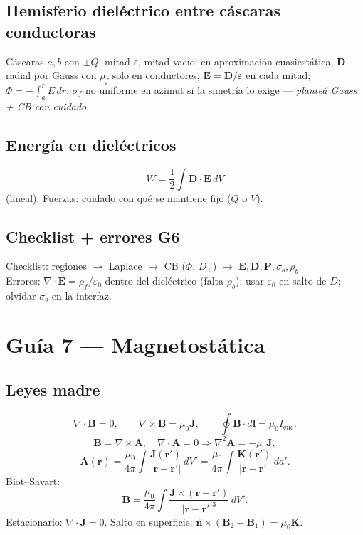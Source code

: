 \documentclass[10pt,a4paper]{article}
\newcommand{\vect}[1]{\mathbf{#1}}
\newcommand{\uv}[1]{\hat{\mathbf{#1}}}
\newcommand{\eps}{\varepsilon}
\newcommand{\epso}{\varepsilon_0}
\newcommand{\muo}{\mu_0}
\begin{document}
\subsection{Hemisferio dieléctrico entre cáscaras conductoras}
Cáscaras $a,b$ con $\pm Q$; mitad $\eps$, mitad vacío: en aproximación cuasiestática, $\vect{D}$ radial por Gauss con $\rho_f$ solo en conductores; $\vect{E}=\vect{D}/\eps$ en cada mitad; $\Phi=-\int_a^r E\,dr$; $\sigma_f$ no uniforme en azimut si la simetría lo exige --- \emph{planteá Gauss + CB con cuidado}.

\subsection{Energía en dieléctricos}
\[
W=\frac12\int\vect{D}\cdot\vect{E}\,dV
\]
(lineal). Fuerzas: cuidado con qué se mantiene fijo ($Q$ o $V$).

\subsection{Checklist + errores G6}
Checklist: regiones $\to$ Laplace $\to$ CB ($\Phi$, $D_\perp$) $\to$ $\vect{E},\vect{D},\vect{P},\sigma_b,\rho_b$.\\
Errores: $\nabla\cdot\vect{E}=\rho_f/\epso$ dentro del dieléctrico (falta $\rho_b$); usar $\epso$ en salto de $D$; olvidar $\sigma_b$ en la interfaz.

\section{Guía 7 --- Magnetostática}

\subsection{Leyes madre}
\[
\nabla\cdot\vect{B}=0,\qquad
\nabla\times\vect{B}=\muo\vect{J},\qquad
\oint\vect{B}\cdot d\vect{l}=\muo I_{\mathrm{enc}}.
\]
\[
\vect{B}=\nabla\times\vect{A},\quad\nabla\cdot\vect{A}=0\Rightarrow\nabla^2\vect{A}=-\muo\vect{J},
\]
\[
\vect{A}(\vect{r})=\frac{\muo}{4\pi}\int\frac{\vect{J}(\vect{r}')}{|\vect{r}-\vect{r}'|}\,dV'
=\frac{\muo}{4\pi}\int\frac{\vect{K}(\vect{r}')}{|\vect{r}-\vect{r}'|}\,da'.
\]
Biot--Savart:
\[
\vect{B}=\frac{\muo}{4\pi}\int\frac{\vect{J}\times(\vect{r}-\vect{r}')}{|\vect{r}-\vect{r}'|^3}\,dV'.
\]
Estacionario: $\nabla\cdot\vect{J}=0$. Salto en superficie: $\uv{n}\times(\vect{B}_2-\vect{B}_1)=\muo\vect{K}$.
\end{document}
